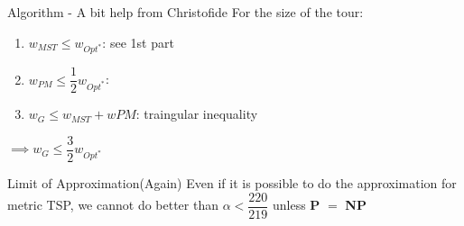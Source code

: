 \documentclass{beamer}
\begin{document}
\begin{frame}{Algorithm - A bit help from Christofide}
    For the size of the tour:
    \begin{enumerate}
        \item $w_{MST} \leq w_{Opt^*}$: see 1st part
        \item $w_{PM} \leq \dfrac{1}{2} w_{Opt^*}$:
        \item $w_{G} \leq w_{MST} + w{PM}$: traingular inequality
    \end{enumerate}
    $\implies w_{G} \leq \dfrac{3}{2} w_{Opt^*}$
\end{frame}

\begin{frame}{Limit of Approximation(Again)}
    Even if it is possible to do the approximation for metric TSP, we cannot do better than $\alpha < \dfrac{220}{219}$
    unless \textbf{P} $=$ \textbf{NP}
\end{frame}
\end{document}
